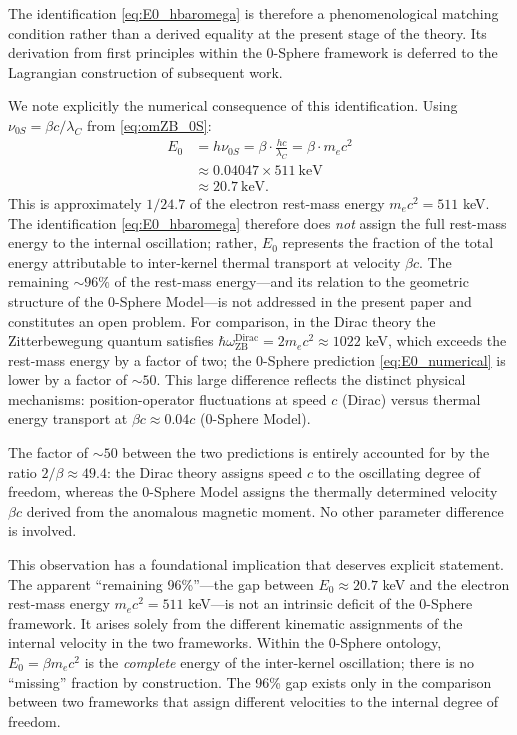 \documentclass[%
 reprint, amsmath,amssymb, aps, prb, ]{revtex4-2}
\numberwithin{equation}{section}
\begin{document}
The identification \eqref{eq:E0_hbaromega} is therefore a phenomenological matching condition rather than a derived equality at the present stage of the theory. Its derivation from first principles within the 0-Sphere framework is deferred to the Lagrangian construction of subsequent work.

We note explicitly the numerical consequence of this identification. Using $\nu_{0S} = \beta c/\lambda_C$ from \eqref{eq:omZB_0S}:
\begin{equation}
\begin{split}
E_0 &= h\nu_{0S} = \beta \cdot \frac{hc}{\lambda_C} = \beta \cdot m_e c^2 \\
&\approx 0.04047 \times 511\ \text{keV} \\
&\approx 20.7\ \text{keV}.
\end{split}
\label{eq:E0_numerical}
\end{equation}
This is approximately $1/24.7$ of the electron rest-mass energy $m_e c^2 = 511$ keV. The identification \eqref{eq:E0_hbaromega} therefore does \emph{not} assign the full rest-mass energy to the internal oscillation; rather, $E_0$ represents the fraction of the total energy attributable to inter-kernel thermal transport at velocity $\beta c$. The remaining $\sim 96\%$ of the rest-mass energy---and its relation to the geometric structure of the 0-Sphere Model---is not addressed in the present paper and constitutes an open problem. For comparison, in the Dirac theory the Zitterbewegung quantum satisfies $\hbar\omega_\text{ZB}^\text{Dirac} = 2m_ec^2 \approx 1022$ keV, which exceeds the rest-mass energy by a factor of two; the 0-Sphere prediction \eqref{eq:E0_numerical} is lower by a factor of $\sim 50$. This large difference reflects the distinct physical mechanisms: position-operator fluctuations at speed $c$ (Dirac) versus thermal energy transport at $\beta c \approx 0.04c$ (0-Sphere Model).

The factor of $\sim 50$ between the two predictions is entirely accounted for by the ratio $2/\beta \approx 49.4$: the Dirac theory assigns speed $c$ to the oscillating degree of freedom, whereas the 0-Sphere Model assigns the thermally determined velocity $\beta c$ derived from the anomalous magnetic moment. No other parameter difference is involved.

This observation has a foundational implication that deserves explicit statement. The apparent ``remaining 96\%''---the gap between $E_0 \approx 20.7$ keV and the electron rest-mass energy $m_ec^2 = 511$ keV---is not an intrinsic deficit of the 0-Sphere framework. It arises solely from the different kinematic assignments of the internal velocity in the two frameworks. Within the 0-Sphere ontology, $E_0 = \beta m_ec^2$ is the \emph{complete} energy of the inter-kernel oscillation; there is no ``missing'' fraction by construction. The 96\% gap exists only in the comparison between two frameworks that assign different velocities to the internal degree of freedom.
\end{document}
